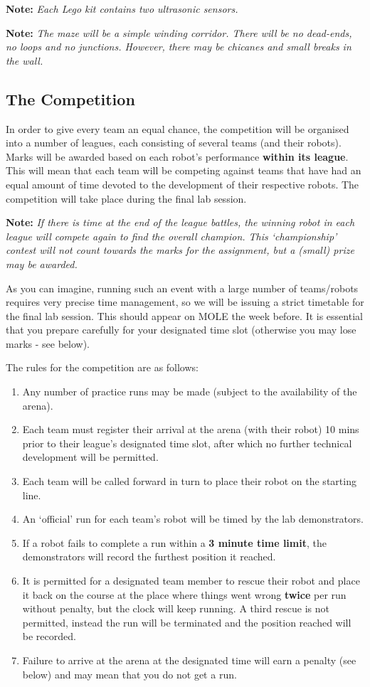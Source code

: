 \documentclass[hidelinks,a4paper,11pt]{article}
\begin{document}
{\bfseries Note:}  \emph{Each Lego kit contains two ultrasonic sensors.}

{\bfseries Note:}  \emph{The maze will be a simple winding corridor.  There will be no dead-ends, no
loops and no junctions.  However, there may be chicanes and small breaks in the wall.}


\subsection{The Competition}

In order to give every team an equal chance, the competition will be organised into a number of
leagues, each consisting of several teams (and their robots).  Marks will be awarded based on each
robot's performance \textbf{within its league}.  This will mean that each team will be competing
against teams that have had an equal amount of time devoted to the development of their respective
robots.  The competition will take place during the final lab session.

{\bfseries Note:}  \emph{If there is time at the end of the league battles, the winning robot in
each league will compete again to find the overall champion.  This `championship' contest will not
count towards the marks for the assignment, but a (small) prize may be awarded.}

As you can imagine, running such an event with a large number of teams/robots requires very precise
time management, so we will be issuing a strict timetable for the final lab session.  This should
appear on MOLE the week before.  It is essential that you prepare carefully for your designated time
slot (otherwise you may lose marks - see below).

The rules for the competition are as follows:
\begin{enumerate}
	\item Any number of practice runs may be made (subject to the availability of the arena).
	\item Each team must register their arrival at the arena (with their robot) 10 mins prior to their
	league's designated time slot, after which no further technical development will be permitted.
	\item Each team will be called forward in turn to place their robot on the starting line.
	\item An `official' run for each team's robot will be timed by the lab demonstrators.
	\item If a robot fails to complete a run within a \textbf{3 minute time limit}, the demonstrators
	will record the furthest position it reached.
	\item It is permitted for a designated team member to rescue their robot and place it back on the
	course at the place where things went wrong \textbf{twice} per run without penalty, but the clock
	will keep running.  A third rescue is not permitted, instead the run will be terminated and the
	position reached will be recorded.
	\item Failure to arrive at the arena at the designated time will earn a penalty (see below) and
	may mean that you do not get a run.
\end{enumerate}
\end{document}
